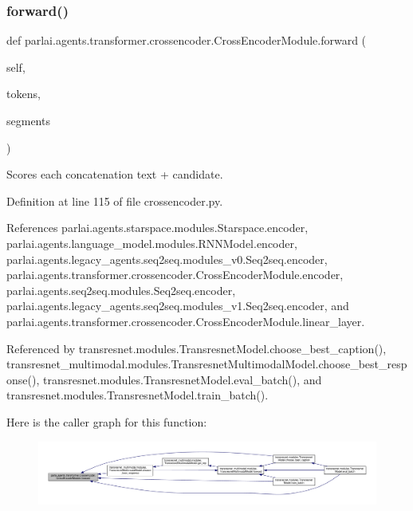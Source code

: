 \subsubsection{\texorpdfstring{forward()}{forward()}}
{\footnotesize\ttfamily def parlai.\+agents.\+transformer.\+crossencoder.\+Cross\+Encoder\+Module.\+forward (\begin{DoxyParamCaption}\item[{}]{self,  }\item[{}]{tokens,  }\item[{}]{segments }\end{DoxyParamCaption})}

\begin{DoxyVerb}Scores each concatenation text + candidate.
\end{DoxyVerb}
 

Definition at line 115 of file crossencoder.\+py.



References parlai.\+agents.\+starspace.\+modules.\+Starspace.\+encoder, parlai.\+agents.\+language\+\_\+model.\+modules.\+R\+N\+N\+Model.\+encoder, parlai.\+agents.\+legacy\+\_\+agents.\+seq2seq.\+modules\+\_\+v0.\+Seq2seq.\+encoder, parlai.\+agents.\+transformer.\+crossencoder.\+Cross\+Encoder\+Module.\+encoder, parlai.\+agents.\+seq2seq.\+modules.\+Seq2seq.\+encoder, parlai.\+agents.\+legacy\+\_\+agents.\+seq2seq.\+modules\+\_\+v1.\+Seq2seq.\+encoder, and parlai.\+agents.\+transformer.\+crossencoder.\+Cross\+Encoder\+Module.\+linear\+\_\+layer.



Referenced by transresnet.\+modules.\+Transresnet\+Model.\+choose\+\_\+best\+\_\+caption(), transresnet\+\_\+multimodal.\+modules.\+Transresnet\+Multimodal\+Model.\+choose\+\_\+best\+\_\+response(), transresnet.\+modules.\+Transresnet\+Model.\+eval\+\_\+batch(), and transresnet.\+modules.\+Transresnet\+Model.\+train\+\_\+batch().

Here is the caller graph for this function\+:
\nopagebreak
\begin{figure}[H]
\begin{center}
\leavevmode
\includegraphics[width=350pt]{classparlai_1_1agents_1_1transformer_1_1crossencoder_1_1CrossEncoderModule_a86a9cf18bddebb5a1ee9c4096cfe7c20_icgraph}
\end{center}
\end{figure}


